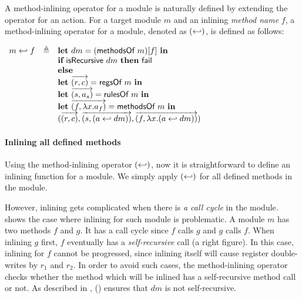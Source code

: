 A method-inlining operator for a module is naturally defined by
extending the operator for an action. For a target module $m$ and an
inlining \emph{method name} $f$, a method-inlining operator for a
module, denoted as $(\hookleftarrow)$, is defined as follows:

\begin{definition}
  \label{def-inlinedmm}
  \mbox{}
  \begin{center}
    \begin{math}
      \begin{array}{rcl}
        \inlinedmm{m}{f} & \triangleq & \pgmlet{} dm = (\methsofm{m})[f]\ \pgmin{} \\
        & & \pgmif{} \isrec{dm}\ \pgmthen{} \fail{} \\
        & & \pgmelse{} \\
        & & \pgmlet{} \listof{\regpair{r}{c}} = \regsofm{m}\ \pgmin{} \\
        & & \pgmlet{} \listof{\rulepair{s}{a_s}} = \rulesofm{m}\ \pgmin{} \\
        & & \pgmlet{} \listof{\methodpair{f}{\lambda x.a_f}} = \methsofm{m}\ \pgmin{} \\
        & & \modbasic{\regpair{r}{c}}
                  {\rulepair{s}{(\inlinedm{a}{dm})}}
                  {\methodpair{f}{\lambda x.(\inlinedm{a}{dm})}} \\
      \end{array}
    \end{math}
  \end{center}
\end{definition}

\paragraph{Inlining all defined methods}

Using the method-inlining operator $(\hookleftarrow)$, now it is
straightforward to define an inlining function for a module. We simply
apply $(\hookleftarrow)$ for all defined methods in the module.

However, inlining gets complicated when there is \emph{a call cycle}
in the module.  shows the case where
inlining for such module is problematic. A module $m$ has two methods
$f$ and $g$. It has a call cycle since $f$ calls $g$ and $g$ calls
$f$. When inlining $g$ first, $f$ eventually has a
\emph{self-recursive} call (a right figure). In this case, inlining
for $f$ cannot be progressed, since inlining itself will cause
register double-writes by $r_1$ and $r_2$. In order to avoid such
cases, the method-inlining operator checks whether the method which
will be inlined has a self-recursive method call or not. As described
in , () ensures that $dm$ is not
self-recursive.

